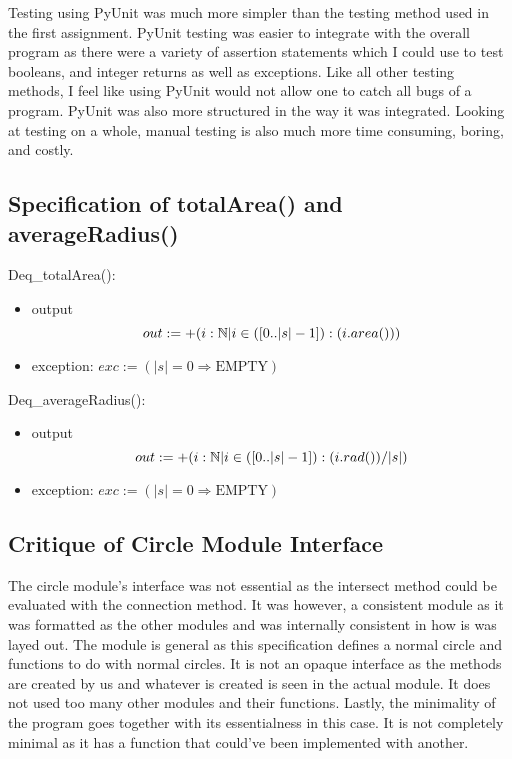\documentclass[12pt]{article}
\begin{document}
Testing using PyUnit was much more simpler than the testing method used in the first assignment. PyUnit testing was easier to integrate with the overall program as there were a variety of assertion statements which I could use to test booleans, and integer returns as well as exceptions. Like all other testing methods, I feel like using PyUnit would not allow one to catch all bugs of a program. PyUnit was also more structured in the way it was integrated. Looking at testing on a whole, manual testing is also much more time consuming, boring, and costly.

\subsection{Specification of totalArea() and averageRadius()}

\noindent Deq\_totalArea():
\begin{itemize}
\item output $$out := +(i: \mathbb{N} | i \in ([0 .. |s|-1]):
  \mbox(i.area()))$$
\item exception: $exc := (|s| = 0 \Rightarrow \mbox{EMPTY})$
\end{itemize}

\noindent Deq\_averageRadius():
\begin{itemize}
\item output $$out := +(i: \mathbb{N} | i \in ([0 .. |s|-1]):
  \mbox(i.rad())/|s|)$$
\item exception: $exc := (|s| = 0 \Rightarrow \mbox{EMPTY})$
\end{itemize}

\subsection{Critique of Circle Module Interface}

The circle module's interface was not essential as the intersect method could be evaluated with the connection method. It was however, a consistent module as it was formatted as the other modules and was internally consistent in how is was layed out. The module is general as this specification defines a normal circle and functions to do with normal circles. It is not an opaque interface as the methods are created by us and whatever is created is seen in the actual module. It does not used too many other modules and their functions. Lastly, the minimality of the program goes together with its essentialness in this case. It is not completely minimal as it has a function that could've been implemented with another. 
\end{document}
